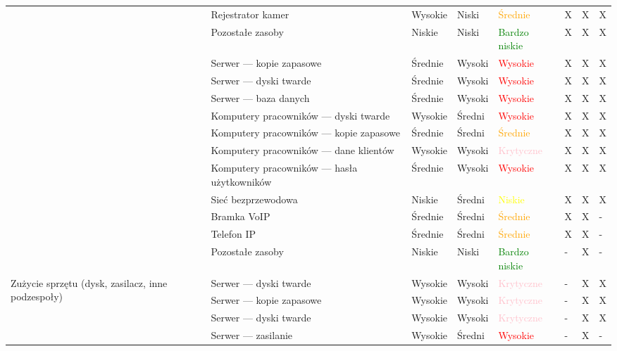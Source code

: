 \begin{landscape}
\begin{longtable}[ht!]{|m{3cm}|m{6cm}|m{4.5cm}|m{3cm}|m{3cm}|m{0.5cm}|m{0.5cm}|m{0.5cm}|}
		& Rejestrator kamer & Wysokie & Niski & \textcolor{orange}{Średnie} & X & X & X  \\ \cline{2-8}
		& Pozostałe zasoby & Niskie & Niski & \textcolor{green}{Bardzo niskie} & X & X & X  \\ \cline{2-8}
		\hline 
		\newpage
		\hline
		\multirow{11}{4cm}{Szkodliwe oprogramowanie} 
		& Serwer --- kopie zapasowe & Średnie & Wysoki & \textcolor{red}{Wysokie} & X & X & X  \\ \cline{2-8}
		& Serwer --- dyski twarde & Średnie & Wysoki & \textcolor{red}{Wysokie} & X & X & X  \\ \cline{2-8}
		& Serwer --- baza danych & Średnie & Wysoki & \textcolor{red}{Wysokie} & X & X & X  \\ \cline{2-8}
		& Komputery pracowników --- dyski twarde & Wysokie & Średni & \textcolor{red}{Wysokie} & X & X & X  \\ \cline{2-8}
		& Komputery pracowników --- kopie zapasowe & Średnie & Średni & \textcolor{orange}{Średnie} & X & X & X  \\ \cline{2-8}
		& Komputery pracowników --- dane klientów & Wysokie & Wysoki & \textcolor{pink}{Krytyczne}& X & X & X  \\ \cline{2-8}
		& Komputery pracowników --- hasła użytkowników & Średnie & Wysoki & \textcolor{red}{Wysokie} & X & X & X  \\ \cline{2-8}
		& Sieć bezprzewodowa & Niskie & Średni & \textcolor{yellow}{Niskie} & X & X & X  \\ \cline{2-8}
		& Bramka VoIP & Średnie & Średni & \textcolor{orange}{Średnie} & X & X & - \\ \cline{2-8}
		& Telefon IP & Średnie & Średni & \textcolor{orange}{Średnie} & X & X & - \\ \cline{2-8}
		& Pozostałe zasoby & Niskie & Niski & \textcolor{green}{Bardzo niskie} & - & X & -  \\ \cline{2-8}
		\hline
		\multirow{6}{4cm}{Zużycie sprzętu (dysk, zasilacz, inne podzespoły)}
		& Serwer --- dyski twarde & Wysokie & Wysoki & \textcolor{pink}{Krytyczne} & - & X & X  \\ \cline{2-8}
		& Serwer --- kopie zapasowe & Wysokie & Wysoki & \textcolor{pink}{Krytyczne} & - & X & X  \\ \cline{2-8}
		& Serwer --- dyski twarde & Wysokie & Wysoki & \textcolor{pink}{Krytyczne} & - & X & X  \\ \cline{2-8}
		& Serwer --- zasilanie & Wysokie &Średni & \textcolor{red}{Wysokie} & - & X & -  \\ \cline{2-8}

\end{longtable}
\end{landscape}
